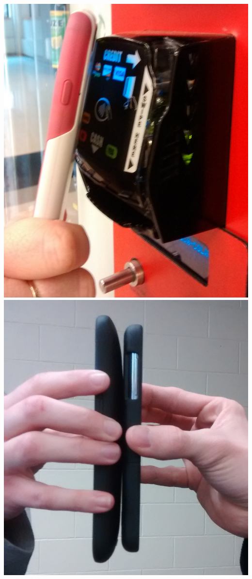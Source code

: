\documentclass[unknownkeysallowed]{beamer}
\begin{document}
\begin{frame}
\begin{block}{}
\begin{center}
        \includegraphics[width=\linewidth,height=0.3\textheight,keepaspectratio]{figures/ApplePay.jpg}
        \includegraphics[width=\linewidth,height=0.3\textheight,keepaspectratio]{figures/peer.jpg}

\end{center}
\end{block}
\end{frame}
\end{document}
